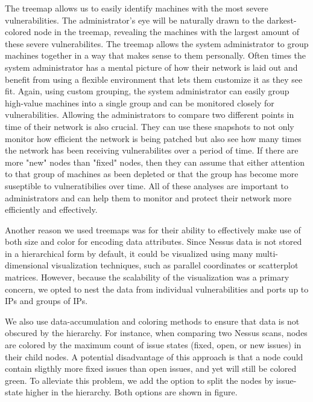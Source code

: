 \documentclass{acm_proc_article-sp}
\begin{document}
The treemap allows us to easily identify machines with the most severe vulnerabilities. The administrator's eye will be naturally drawn to the darkest-colored node in the treemap, revealing the machines with the largest amount of these severe vulnerabilites. The treemap allows the system administrator to group machines together in a way that makes sense to them personally. Often times the system administrator has a mental picture of how their network is laid out and benefit from using a flexible environment that lets them customize it as they see fit. Again, using custom grouping, the system administrator can easily group high-value machines into a single group and can be monitored closely for vulnerabilities. Allowing the administrators to compare two different points in time of their network is also crucial. They can use these snapshots to not only monitor how efficient the network is being patched but also see how many times the network has been receiving vulnerabilites over a period of time. If there are more "new" nodes than "fixed" nodes, then they can assume that either attention to that group of machines as been depleted or that the group has become more suseptible to vulneratibilies over time. All of these analyses are important to administrators and can help them to monitor and protect their network more efficiently and effectively.

Another reason we used treemaps was for their ability to effectively make use of both size and color for encoding data attributes.
Since Nessus data is not stored in a hierarchical form by default, it could be visualized using many multi-dimensional visualization techniques, such as parallel coordinates or scatterplot matrices.
However, because the scalability of the visualization was a primary concern, we opted to nest the data from individual vulnerabilities and ports up to IPs and groups of IPs.

We also use data-accumulation and coloring methods to ensure that data is not obscured by the hierarchy.
For instance, when comparing two Nessus scans, nodes are colored by the maximum count of issue states (fixed, open, or new issues) in their child nodes.
A potential disadvantage of this approach is that a node could contain sligthly more fixed issues than open issues, and yet will still be colored green.
To alleviate this problem, we add the option to split the nodes by issue-state higher in the hierarchy.
Both options are shown in figure.
\end{document}
